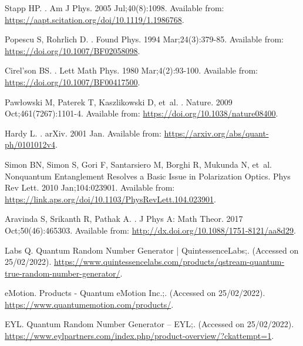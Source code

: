 \documentclass[]{interact}
\theoremstyle{plain}%
\theoremstyle{definition}
\theoremstyle{remark}
\begin{document}
\begin{thebibliography}{100}
Stapp HP.
.
\newblock Am J Phys. 2005 Jul;40(8):1098.
\newblock Available from:
  \url{https://aapt.scitation.org/doi/10.1119/1.1986768}.

Popescu S, Rohrlich D.
.
\newblock Found Phys. 1994 Mar;24(3):379-85.
\newblock Available from: \url{https://doi.org/10.1007/BF02058098}.

Cirel'son BS.
.
\newblock Lett Math Phys. 1980 Mar;4(2):93-100.
\newblock Available from: \url{https://doi.org/10.1007/BF00417500}.

Paw{\l}owski M, Paterek T, Kaszlikowski D, et~al.
.
\newblock Nature. 2009 Oct;461(7267):1101-4.
\newblock Available from: \url{https://doi.org/10.1038/nature08400}.

Hardy L.
.
\newblock arXiv. 2001 Jan.
\newblock Available from: \url{https://arxiv.org/abs/quant-ph/0101012v4}.

Simon BN, Simon S, Gori F, Santarsiero M, Borghi R, Mukunda N, et~al.
\newblock Nonquantum Entanglement Resolves a Basic Issue in Polarization
  Optics.
\newblock Phys Rev Lett. 2010 Jan;104:023901.
\newblock Available from:
  \url{https://link.aps.org/doi/10.1103/PhysRevLett.104.023901}.

Aravinda S, Srikanth R, Pathak A.
.
\newblock J Phys A: Math Theor. 2017 Oct;50(46):465303.
\newblock Available from: \url{http://dx.doi.org/10.1088/1751-8121/aa8d29}.

Labs Q. Quantum Random Number Generator | QuintessenceLabs;.
\newblock (Accessed on 25/02/2022).
\newblock
  \url{https://www.quintessencelabs.com/products/qstream-quantum-true-random-number-generator/}.

eMotion. Products - Quantum eMotion Inc.;.
\newblock (Accessed on 25/02/2022).
\newblock \url{https://www.quantumemotion.com/products/}.

EYL. Quantum Random Number Generator – EYL;.
\newblock (Accessed on 25/02/2022).
\newblock
  \url{https://www.eylpartners.com/index.php/product-overview/?ckattempt=1}.


\end{thebibliography}
\end{document}
